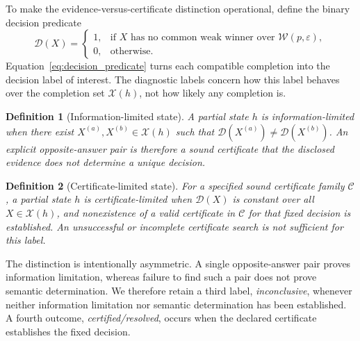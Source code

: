 \documentclass[preprint,11pt]{elsarticle}
\newtheorem{definition}{Definition}
\begin{document}
To make the evidence-versus-certificate distinction operational, define the binary decision predicate
\begin{equation}\label{eq:decision_predicate}
\mathcal D(X)=
\begin{cases}
1, & \text{if }X\text{ has no common weak winner over }\mathcal W(p,\varepsilon),\\
0, & \text{otherwise.}
\end{cases}
\end{equation}
Equation~\eqref{eq:decision_predicate} turns each compatible completion into the decision label of interest. The diagnostic labels concern how this label behaves over the completion set $\mathcal X(h)$, not how likely any completion is.

\begin{definition}[Information-limited state]
A partial state $h$ is information-limited when there exist $X^{(a)},X^{(b)}\in\mathcal X(h)$ such that $\mathcal D(X^{(a)})\ne\mathcal D(X^{(b)})$. An explicit opposite-answer pair is therefore a sound certificate that the disclosed evidence does not determine a unique decision.
\end{definition}

\begin{definition}[Certificate-limited state]
For a specified sound certificate family $\mathcal C$, a partial state $h$ is certificate-limited when $\mathcal D(X)$ is constant over all $X\in\mathcal X(h)$, and nonexistence of a valid certificate in $\mathcal C$ for that fixed decision is established. An unsuccessful or incomplete certificate search is not sufficient for this label.
\end{definition}

The distinction is intentionally asymmetric. A single opposite-answer pair proves information limitation, whereas failure to find such a pair does not prove semantic determination. We therefore retain a third label, \emph{inconclusive}, whenever neither information limitation nor semantic determination has been established. A fourth outcome, \emph{certified/resolved}, occurs when the declared certificate establishes the fixed decision.
\end{document}

